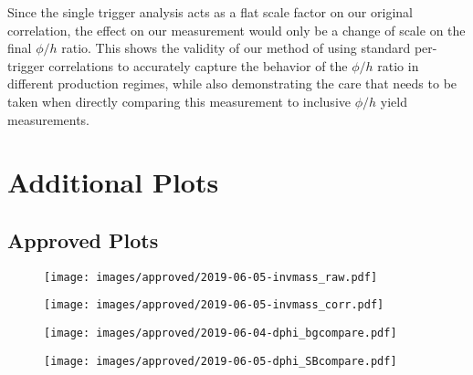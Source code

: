 \documentclass[ALICE,manyauthors]{ALICE_analysis_notes}
\begin{document}
Since the single trigger analysis acts as a flat scale factor on our original correlation, the effect on our measurement would only be a change of scale on the final $\phi/h$ ratio.  This shows the validity of our method of using standard per-trigger correlations to accurately capture the behavior of the $\phi/h$ ratio in different production regimes, while also demonstrating the care that needs to be taken when directly comparing this measurement to inclusive $\phi/h$ yield measurements. 

\clearpage
\section {Additional Plots}

\subsection{Approved Plots}

\begin{figure}[!htb]
\centering
\texttt{[image: images/approved/2019-06-05-invmass\_raw.pdf]}
\caption{}
\label{}
\end{figure}

\begin{figure}[!htb]
\centering
\texttt{[image: images/approved/2019-06-05-invmass\_corr.pdf]}
\caption{}
\label{}
\end{figure}

\begin{figure}[!htb]
\centering
\texttt{[image: images/approved/2019-06-04-dphi\_bgcompare.pdf]}
\caption{}
\label{}
\end{figure}

\begin{figure}[!htb]
\centering
\texttt{[image: images/approved/2019-06-05-dphi\_SBcompare.pdf]}
\caption{}
\label{}
\end{figure}

\begin{figure}[!htb]
\centering
\begin{subfigure}{
\texttt{[image: images/approved/2019-06-05-dphi\_hhall.pdf]}}
\end{subfigure}
\begin{subfigure}{
\texttt{[image: images/approved/2019-06-05-dphi\_hphiall.pdf]}
}
\end{subfigure}
\caption{}
\label{}
\end{figure}
\end{document}
